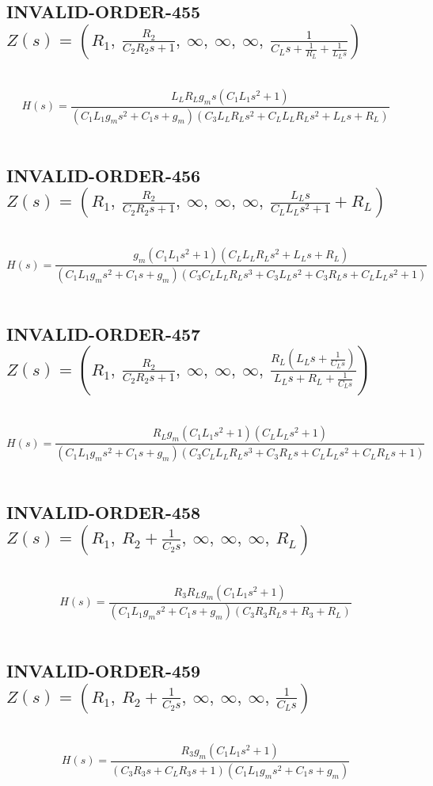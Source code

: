 \documentclass{article}
\begin{document}
\subsection{INVALID-ORDER-455 $Z(s) = \left( R_{1}, \  \frac{R_{2}}{C_{2} R_{2} s + 1}, \  \infty, \  \infty, \  \infty, \  \frac{1}{C_{L} s + \frac{1}{R_{L}} + \frac{1}{L_{L} s}}\right)$ } \ 
\textbf{\[H(s) = \frac{L_{L} R_{L} g_{m} s \left(C_{1} L_{1} s^{2} + 1\right)}{\left(C_{1} L_{1} g_{m} s^{2} + C_{1} s + g_{m}\right) \left(C_{3} L_{L} R_{L} s^{2} + C_{L} L_{L} R_{L} s^{2} + L_{L} s + R_{L}\right)}\] } \ 
\subsection{INVALID-ORDER-456 $Z(s) = \left( R_{1}, \  \frac{R_{2}}{C_{2} R_{2} s + 1}, \  \infty, \  \infty, \  \infty, \  \frac{L_{L} s}{C_{L} L_{L} s^{2} + 1} + R_{L}\right)$ } \ 
\textbf{\[H(s) = \frac{g_{m} \left(C_{1} L_{1} s^{2} + 1\right) \left(C_{L} L_{L} R_{L} s^{2} + L_{L} s + R_{L}\right)}{\left(C_{1} L_{1} g_{m} s^{2} + C_{1} s + g_{m}\right) \left(C_{3} C_{L} L_{L} R_{L} s^{3} + C_{3} L_{L} s^{2} + C_{3} R_{L} s + C_{L} L_{L} s^{2} + 1\right)}\] } \ 
\subsection{INVALID-ORDER-457 $Z(s) = \left( R_{1}, \  \frac{R_{2}}{C_{2} R_{2} s + 1}, \  \infty, \  \infty, \  \infty, \  \frac{R_{L} \left(L_{L} s + \frac{1}{C_{L} s}\right)}{L_{L} s + R_{L} + \frac{1}{C_{L} s}}\right)$ } \ 
\textbf{\[H(s) = \frac{R_{L} g_{m} \left(C_{1} L_{1} s^{2} + 1\right) \left(C_{L} L_{L} s^{2} + 1\right)}{\left(C_{1} L_{1} g_{m} s^{2} + C_{1} s + g_{m}\right) \left(C_{3} C_{L} L_{L} R_{L} s^{3} + C_{3} R_{L} s + C_{L} L_{L} s^{2} + C_{L} R_{L} s + 1\right)}\] } \ 
\subsection{INVALID-ORDER-458 $Z(s) = \left( R_{1}, \  R_{2} + \frac{1}{C_{2} s}, \  \infty, \  \infty, \  \infty, \  R_{L}\right)$ } \ 
\textbf{\[H(s) = \frac{R_{3} R_{L} g_{m} \left(C_{1} L_{1} s^{2} + 1\right)}{\left(C_{1} L_{1} g_{m} s^{2} + C_{1} s + g_{m}\right) \left(C_{3} R_{3} R_{L} s + R_{3} + R_{L}\right)}\] } \ 
\subsection{INVALID-ORDER-459 $Z(s) = \left( R_{1}, \  R_{2} + \frac{1}{C_{2} s}, \  \infty, \  \infty, \  \infty, \  \frac{1}{C_{L} s}\right)$ } \ 
\textbf{\[H(s) = \frac{R_{3} g_{m} \left(C_{1} L_{1} s^{2} + 1\right)}{\left(C_{3} R_{3} s + C_{L} R_{3} s + 1\right) \left(C_{1} L_{1} g_{m} s^{2} + C_{1} s + g_{m}\right)}\] } \ 
\end{document}
